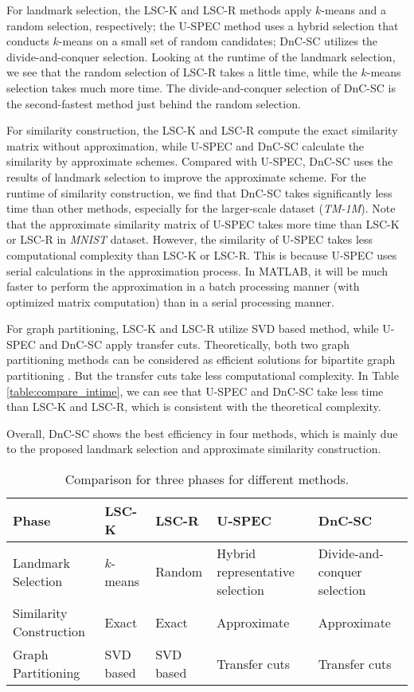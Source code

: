 For landmark selection, the LSC-K and LSC-R methods apply $k$-means and a random selection, respectively; the U-SPEC method uses a hybrid selection that conducts $k$-means on a small set of random candidates;
DnC-SC utilizes the divide-and-conquer selection.
Looking at the runtime of the landmark selection, we see that the random selection of LSC-R takes a little time, while the $k$-means selection takes much more time.
The divide-and-conquer selection of DnC-SC is the second-fastest method just behind the random selection.

For similarity construction, the LSC-K and LSC-R compute the exact similarity matrix without approximation, while U-SPEC and DnC-SC calculate the similarity by approximate schemes.
Compared with U-SPEC, DnC-SC uses the results of landmark selection to improve the approximate scheme.
For the runtime of similarity construction, we find that DnC-SC takes significantly less time than other methods, especially for the larger-scale dataset (\emph{TM-1M}).
Note that the approximate similarity matrix of U-SPEC takes more time than LSC-K or LSC-R in \emph{MNIST} dataset.
However, the similarity of U-SPEC takes less computational complexity than LSC-K or LSC-R.
This is because U-SPEC uses serial calculations in the approximation process.
In MATLAB, it will be much faster to perform the approximation in a batch processing manner (with optimized matrix computation) than in a serial processing manner.

For graph partitioning, LSC-K and LSC-R utilize SVD based method, while U-SPEC and DnC-SC apply transfer cuts.
Theoretically, both two graph partitioning methods can be considered as efficient solutions for bipartite graph partitioning \cite{li2012segmentation,cai2014large}.
But the transfer cuts take less computational complexity.
In Table \ref{table:compare_intime}, we can see that U-SPEC and DnC-SC take less time than LSC-K and LSC-R, which is consistent with the theoretical complexity.

Overall, DnC-SC shows the best efficiency in four methods, which is mainly due to the proposed landmark selection and approximate similarity construction.

\begin{table*}[]
  \centering
  \caption{Comparison for three phases for different methods.}
  \label{table:compare_three_phases}
  \begin{tabular}{@{}l|llll@{}}
    \toprule
    Phase                   & LSC-K     & LSC-R     & U-SPEC                          & DnC-SC                       \\ \midrule
    Landmark Selection      & $k$-means & Random    & Hybrid representative selection & Divide-and-conquer selection \\
    Similarity Construction & Exact     & Exact     & Approximate                     & Approximate                  \\
    Graph Partitioning      & SVD based & SVD based & Transfer cuts                   & Transfer cuts                \\ \bottomrule
  \end{tabular}
\end{table*}

